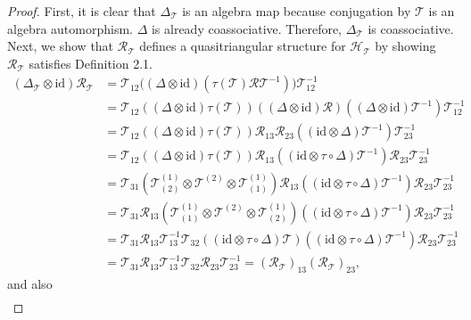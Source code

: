 \documentclass[reqno]{amsart}
\theoremstyle{definition}
\theoremstyle{remark}
\begin{document}
\begin{proof}
    First, it is clear that $\Delta_\mathcal{T}$ is an algebra map because conjugation by $\mathcal{T}$ is an algebra automorphism. $\Delta$ is already coassociative. Therefore, $\Delta_\mathcal{T}$ is coassociative. Next, we show that $\mathcal{R}_\mathcal{T}$ defines a quasitriangular structure for $\mathscr{H}_\mathcal{T}$ by showing $\mathcal{R}_\mathcal{T}$ satisfies Definition 2.1. 
    \begin{equation}
        \begin{split}
            (\Delta_{\mathcal{T}}\otimes \textrm{id})\mathcal{R}_{\mathcal{T}}
&= \mathcal{T}_{12}\bigl((\Delta\otimes \textrm{id})(\tau(\mathcal{T})\mathcal{R}\mathcal{T}^{-1})\bigr)\mathcal{T}_{12}^{-1} \\
&= \mathcal{T}_{12}((\Delta\otimes \textrm{id})\tau(\mathcal{T}))((\Delta\otimes \textrm{id})\mathcal{R})((\Delta\otimes \textrm{id})\mathcal{T}^{-1})\mathcal{T}_{12}^{-1} \\
&= \mathcal{T}_{12}((\Delta\otimes \textrm{id})\tau(\mathcal{T}))\mathcal{R}_{13}\mathcal{R}_{23}((\textrm{id}\otimes \Delta)\mathcal{T}^{-1})\mathcal{T}_{23}^{-1} \\
&= \mathcal{T}_{12}((\Delta\otimes \textrm{id})\tau(\mathcal{T}))\mathcal{R}_{13}((\textrm{id}\otimes \tau\circ \Delta)\mathcal{T}^{-1})\mathcal{R}_{23}\mathcal{T}_{23}^{-1} \\
&= \mathcal{T}_{31}(\mathcal{T}^{(1)}_{(2)}\otimes \mathcal{T}^{(2)}\otimes \mathcal{T}^{(1)}_{(1)})\mathcal{R}_{13}((\textrm{id}\otimes \tau\circ \Delta)\mathcal{T}^{-1})\mathcal{R}_{23}\mathcal{T}_{23}^{-1} \\
&= \mathcal{T}_{31}\mathcal{R}_{13}(\mathcal{T}^{(1)}_{(1)}\otimes \mathcal{T}^{(2)}\otimes \mathcal{T}^{(1)}_{(2)})((\textrm{id}\otimes \tau\circ \Delta)\mathcal{T}^{-1})\mathcal{R}_{23}\mathcal{T}_{23}^{-1} \\
&= \mathcal{T}_{31}\mathcal{R}_{13}\mathcal{T}_{13}^{-1}\mathcal{T}_{32}((\textrm{id}\otimes \tau\circ \Delta)\mathcal{T})((\textrm{id}\otimes \tau\circ \Delta)\mathcal{T}^{-1})\mathcal{R}_{23}\mathcal{T}_{23}^{-1} \\
&= \mathcal{T}_{31}\mathcal{R}_{13}\mathcal{T}_{13}^{-1}\mathcal{T}_{32}\mathcal{R}_{23}\mathcal{T}_{23}^{-1} 
= (\mathcal{R}_{\mathcal{T}})_{13}(\mathcal{R}_{\mathcal{T}})_{23},
        \end{split}
    \end{equation}
    and also
    \begin{equation}
        \begin{split}

\end{split}
\end{equation}
\end{proof}
\end{document}
